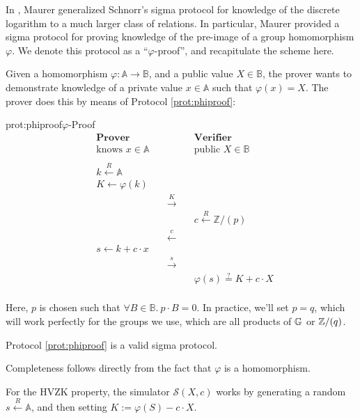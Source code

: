 In \cite{maurer_unifying_2009}, Maurer generalized Schnorr's sigma 
protocol for knowledge of the discrete logarithm \cite{schnorr_efficient_1990} to a much larger class
of relations. In particular, Maurer provided a sigma protocol for
proving knowledge of the pre-image of a group homomorphism $\varphi$.
We denote this protocol as a ``$\varphi$-proof'', and recapitulate the scheme
here.

Given a homomorphism $\varphi : \mathbb{A} \to \mathbb{B}$, and a public value
$X \in \mathbb{B}$, the prover wants to demonstrate knowledge of a private
value $x \in \mathbb{A}$ such that $\varphi(x) = X$. The prover
does this by means of Protocol \ref{prot:phiproof}:

\begin{aprotocol}{prot:phiproof}{$\varphi$-Proof}
\[
\begin{aligned}
    &\textbf{Prover}&&\textbf{Verifier}\\
    &\text{knows } x \in \mathbb{A}&&\text{public } X \in \mathbb{B}\\
    \\
    &k \xleftarrow{R} \mathbb{A}&\\
    &K \gets \varphi(k)&\\
    &&\quad\overset{K}{\longrightarrow}\quad\\
    &&&c \xleftarrow{R} \mathbb{Z}/(p)\\
    &&\quad\overset{c}{\longleftarrow}\quad\\
    &s \gets k + c \cdot x\\
    &&\quad\overset{s}{\longrightarrow}\quad\\
    &&& \varphi(s) \overset{?}{=} K + c \cdot X\\
\end{aligned}
\]
\end{aprotocol}

Here, $p$ is chosen such that $\forall B \in \mathbb{B}.\ p \cdot B = 0$.
In practice, we'll set $p = q$, which will work perfectly for the groups
we use, which are all products of $\mathbb{G}$ or $\mathbb{Z}/(q)$.

\begin{claim}
    Protocol \ref{prot:phiproof} is a valid sigma protocol.
\end{claim}

Completeness follows directly from the fact that $\varphi$ is a homomorphism.

For the HVZK property, the simulator $\mathcal{S}(X, c)$ works by generating
a random $s \xleftarrow{R} \mathbb{A}$, and then setting $K := \varphi(S) - c \cdot X$.

